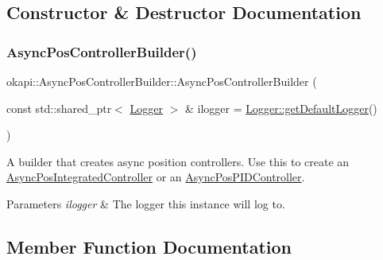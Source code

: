 \subsection{Constructor \& Destructor Documentation}
\mbox{\label{classokapi_1_1AsyncPosControllerBuilder_ab5016bcf0679d7bae87d19d21cbff95f}} 
\subsubsection{\texorpdfstring{AsyncPosControllerBuilder()}{AsyncPosControllerBuilder()}}
{\footnotesize\ttfamily okapi\+::\+Async\+Pos\+Controller\+Builder\+::\+Async\+Pos\+Controller\+Builder (\begin{DoxyParamCaption}\item[{const std\+::shared\+\_\+ptr$<$ \mbox{\hyperlink{classokapi_1_1Logger}{Logger}} $>$ \&}]{ilogger = {\ttfamily \mbox{\hyperlink{classokapi_1_1Logger_a5053cf778b4b55acba788a3797dc96d2}{Logger\+::get\+Default\+Logger}}()} }\end{DoxyParamCaption})\hspace{0.3cm}{\ttfamily [explicit]}}

A builder that creates async position controllers. Use this to create an \mbox{\hyperlink{classokapi_1_1AsyncPosIntegratedController}{Async\+Pos\+Integrated\+Controller}} or an \mbox{\hyperlink{classokapi_1_1AsyncPosPIDController}{Async\+Pos\+P\+I\+D\+Controller}}.


\begin{DoxyParams}{Parameters}
{\em ilogger} & The logger this instance will log to. \\
\hline
\end{DoxyParams}


\subsection{Member Function Documentation}
\mbox{\label{classokapi_1_1AsyncPosControllerBuilder_a15bce1f485fee03c7f1772736eea7075}} 
